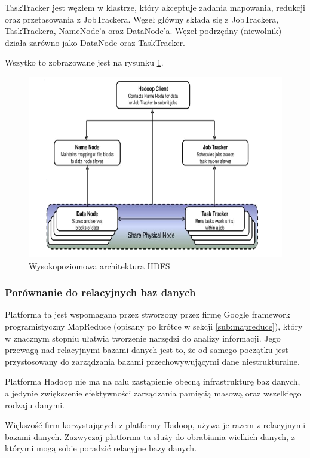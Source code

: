 TaskTracker jest węzłem w klastrze, który akceptuje zadania mapowania, redukcji oraz przetasowania z JobTrackera. Węzeł główny składa się z JobTrackera, TaskTrackera, NameNode'a oraz DataNode'a. Węzeł podrzędny (niewolnik) działa zarówno jako DataNode oraz TaskTracker.

Wszytko to zobrazowane jest na rysunku \ref{fig:hdfs_hight_level_architecture}.

\begin{figure}[h]
    \centerline{\includegraphics[scale=0.5]{obrazki/wysokopoziomowa_architektura_hadoop.png}}
    \caption{Wysokopoziomowa architektura HDFS}
    \label{fig:hdfs_hight_level_architecture}
\end{figure}


\subsubsection{Porównanie do relacyjnych baz danych}
\label{ssub:porownanie_z_relacyjnymi}
Platforma ta jest wspomagana przez stworzony przez firmę Google framework programistyczny MapReduce (opisany po krótce w sekcji \ref{sub:mapreduce}), który w znacznym stopniu ułatwia tworzenie narzędzi do analizy informacji. Jego przewagą nad relacyjnymi bazami danych jest to, że od samego początku jest przystosowany do zarządzania bazami przechowywującymi dane niestrukturalne.

Platforma Hadoop nie ma na calu zastąpienie obecną infrastrukturę baz danych, a jedynie zwiększenie efektywności zarządzania pamięcią masową oraz wszelkiego rodzaju danymi.

Większość firm korzystających z platformy Hadoop, używa je razem z relacyjnymi bazami danych. Zazwyczaj platforma ta służy do obrabiania wielkich danych, z którymi mogą sobie poradzić relacyjne bazy danych.



